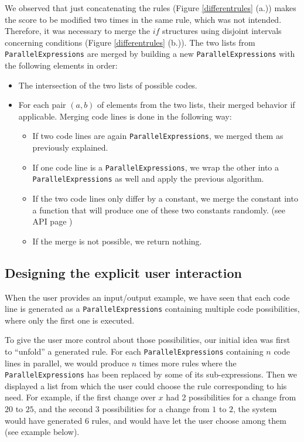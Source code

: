 \documentclass[12pt]{article} %
\begin{document}
\newcommand{\pp}{\texttt{ParallelExpressions}}
We observed that just concatenating the rules (Figure \ref{differentrules} (a.))
makes the score to be modified two times in the same rule, which was not intended.
Therefore, it was necessary to merge the $if$ structures using
disjoint intervals concerning conditions (Figure \ref{differentrules} (b.)). The
two lists from \pp{} are merged by building a new
\pp{} with the following elements in order:

\begin{itemize}
  \item The intersection of the two lists of possible codes.
  \item For each pair $(a,b)$ of elements from the two lists, their merged
  behavior if applicable. Merging code lines is done in the following way:
  \begin{itemize}
    \item If two code lines are again \pp{}, we merged
    them as previously explained.
    \item If one code line is a \pp{}, we wrap the other into a \pp{} as well and
    apply the previous algorithm.
    \item If the two code lines only differ by a constant, we merge the constant
    into a function that will produce one of these two constants randomly. (see
    API page \pageref{gameAPI})
    \item If the merge is not possible, we return nothing.
  \end{itemize}
\end{itemize}

\subsection{Designing the explicit user interaction}

When the user provides an input/output example, we have seen that each
code line is generated as a \pp{} containing
multiple code possibilities, where only the first one is executed.

To give the user more control about those possibilities, our initial idea was
first to ``unfold'' a generated rule. For each \pp{} containing $n$ code lines
in parallel, we would produce $n$ times more rules where the \pp{}
has been replaced by some of its sub-expressions.
Then we displayed a list from which the user could choose the rule corresponding
to his need. For example, if the first change over $x$ had 2 possibilities for a
change from $20$ to $25$, and the second 3 possibilities for a change from $1$
to $2$, the system would have generated 6 rules, and would have let the user choose
among them (see example below).
\end{document}
